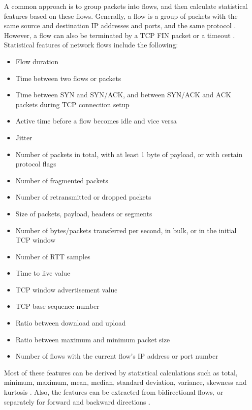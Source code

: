 \documentclass[conference]{IEEEtran}
\begin{document}
A common approach is to group packets into flows, and then calculate statistical features based on these flows. Generally, a flow is a group of packets with the same source and destination IP addresses and ports, and the same protocol \cite{brownlee1998}. However, a flow can also be terminated by a TCP FIN packet or a timeout \cite{Ids2018}. Statistical features of network flows include the following:
\begin{itemize}
	\item Flow duration \cite{Nb2015} \cite{Ids2018}
	\item Time between two flows or packets \cite{Ids2018}
	\item Time between SYN and SYN/ACK, and between SYN/ACK and ACK packets during TCP connection setup \cite{Nb2015}
	\item Active time before a flow becomes idle and vice versa \cite{Ids2018}
	\item Jitter \cite{Nb2015}
	\item Number of packets in total, with at least 1 byte of payload, or with certain protocol flags \cite{Ids2018} \cite{waizumi2007} \cite{celik2015}
	\item Number of fragmented packets \cite{waizumi2007}
	\item Number of retransmitted or dropped packets \cite{Nb2015}
	\item Size of packets, payload, headers or segments \cite{Ids2018} \cite{celik2015}
	\item Number of bytes/packets transferred per second, in bulk, or in the initial TCP window \cite{Ids2018} \cite{celik2015}
	\item Number of RTT samples \cite{celik2015}
	\item Time to live value \cite{Nb2015}
	\item TCP window advertisement value \cite{Nb2015}
	\item TCP base sequence number \cite{Nb2015}
	\item Ratio between download and upload \cite{Ids2018}
	\item Ratio between maximum and minimum packet size \cite{celik2015}
	\item Number of flows with the current flow's IP address or port number \cite{waizumi2007} \cite{Nb2015}
\end{itemize}
Most of these features can be derived by statistical calculations such as total, minimum, maximum, mean, median, standard deviation, variance, skewness and kurtosis \cite{Ids2018} \cite{celik2015, xu2015}. Also, the features can be extracted from bidirectional flows, or separately for forward and backward directions \cite{Ids2018}.
\end{document}
